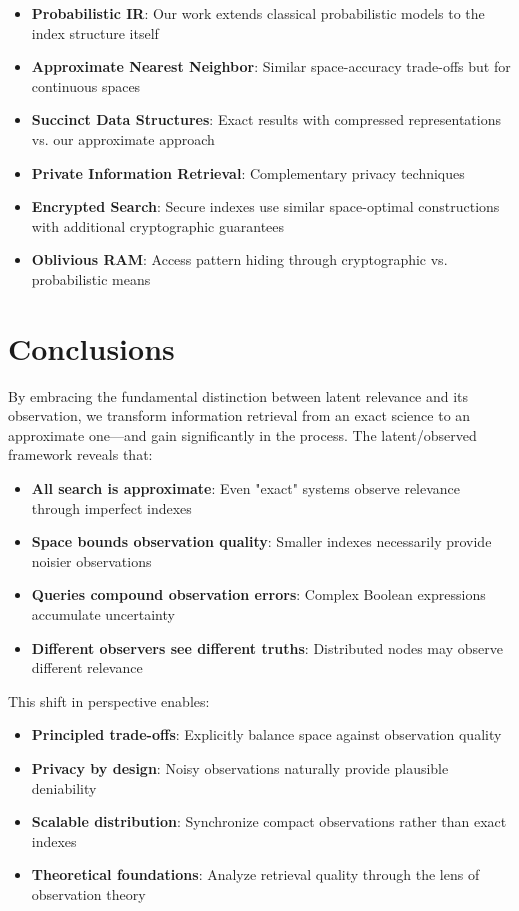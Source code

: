 \documentclass[11pt,final,hidelinks]{article}
\begin{document}
\begin{itemize}
    \item \textbf{Probabilistic IR}: Our work extends classical probabilistic models to the index structure itself
    \item \textbf{Approximate Nearest Neighbor}: Similar space-accuracy trade-offs but for continuous spaces
    \item \textbf{Succinct Data Structures}: Exact results with compressed representations vs. our approximate approach
    \item \textbf{Private Information Retrieval}: Complementary privacy techniques
    \item \textbf{Encrypted Search}: Secure indexes use similar space-optimal constructions with additional cryptographic guarantees
    \item \textbf{Oblivious RAM}: Access pattern hiding through cryptographic vs. probabilistic means
\end{itemize}

\section{Conclusions}

By embracing the fundamental distinction between latent relevance and its observation, we transform information retrieval from an exact science to an approximate one—and gain significantly in the process. The latent/observed framework reveals that:

\begin{itemize}
    \item \textbf{All search is approximate}: Even "exact" systems observe relevance through imperfect indexes
    \item \textbf{Space bounds observation quality}: Smaller indexes necessarily provide noisier observations
    \item \textbf{Queries compound observation errors}: Complex Boolean expressions accumulate uncertainty
    \item \textbf{Different observers see different truths}: Distributed nodes may observe different relevance
\end{itemize}

This shift in perspective enables:
\begin{itemize}
    \item \textbf{Principled trade-offs}: Explicitly balance space against observation quality
    \item \textbf{Privacy by design}: Noisy observations naturally provide plausible deniability
    \item \textbf{Scalable distribution}: Synchronize compact observations rather than exact indexes
    \item \textbf{Theoretical foundations}: Analyze retrieval quality through the lens of observation theory
\end{itemize}
\end{document}
